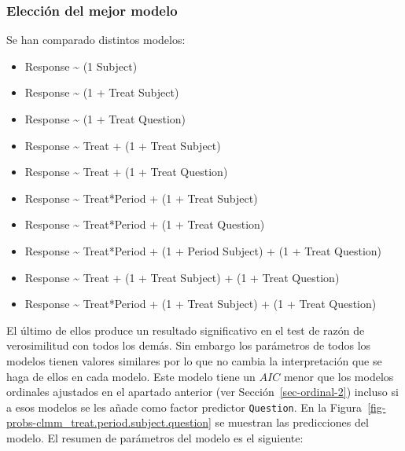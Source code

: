 \documentclass[
  12pt,
  a4paper,
  extrafontsizes,
  onecolumn,
  openright,
  table]{memoir}
\providecommand{\tightlist}{%
  \setlength{\itemsep}{0pt}\setlength{\parskip}{0pt}}\usepackage{longtable,booktabs,array}
\begin{document}
\normalsize

\hypertarget{elecciuxf3n-del-mejor-modelo}{%
\subsubsection{Elección del mejor
modelo}\label{elecciuxf3n-del-mejor-modelo}}

Se han comparado distintos modelos:

\begin{itemize}
\tightlist
\item
  Response \textasciitilde{} (1 \textbar{} Subject)
\item
  Response \textasciitilde{} (1 + Treat \textbar{} Subject)
\item
  Response \textasciitilde{} (1 + Treat \textbar{} Question)
\item
  Response \textasciitilde{} Treat + (1 + Treat \textbar{} Subject)
\item
  Response \textasciitilde{} Treat + (1 + Treat \textbar{} Question)
\item
  Response \textasciitilde{} Treat*Period + (1 + Treat \textbar{}
  Subject)
\item
  Response \textasciitilde{} Treat*Period + (1 + Treat \textbar{}
  Question)
\item
  Response \textasciitilde{} Treat*Period + (1 + Period \textbar{}
  Subject) + (1 + Treat \textbar{} Question)
\item
  Response \textasciitilde{} Treat + (1 + Treat \textbar{} Subject) + (1
  + Treat \textbar{} Question)
\item
  Response \textasciitilde{} Treat*Period + (1 + Treat \textbar{}
  Subject) + (1 + Treat \textbar{} Question)
\end{itemize}

El último de ellos produce un resultado significativo en el test de
razón de verosimilitud con todos los demás. Sin embargo los parámetros
de todos los modelos tienen valores similares por lo que no cambia la
interpretación que se haga de ellos en cada modelo. Este modelo tiene un
\(AIC\) menor que los modelos ordinales ajustados en el apartado
anterior (ver Sección~\ref{sec-ordinal-2}) incluso si a esos modelos se
les añade como factor predictor \texttt{Question}. En la
Figura~\ref{fig-probs-clmm_treat.period.subject.question} se muestran
las predicciones del modelo. El resumen de parámetros del modelo es el
siguiente:

\scriptsize
\end{document}
